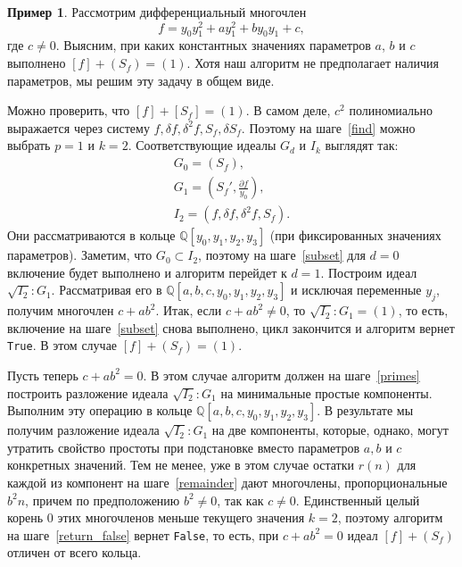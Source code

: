 \documentclass[11pt]{article}
\theoremstyle{plain}
\theoremstyle{definition}
\newtheorem{example}[theorem3]{Пример}
\theoremstyle{remark}
\begin{document}
\label{examples}
\begin{example}\label{example:first}
Рассмотрим дифференциальный многочлен 
$$
f= y_0 y_1^2+ay_1^2+by_0 y_1+c,
$$
где $c \ne 0$.
Выясним, при каких константных значениях параметров $a$, $b$ и $c$ выполнено $[f]+(S_f)=(1)$.
Хотя наш алгоритм не предполагает наличия параметров, мы решим эту задачу в общем виде.

Можно проверить, что $[f] + [S_f] = (1)$.
В самом деле, $c^2$ полиномиально выражается через систему $f, \delta f, \delta^2 f, S_f, \delta {S_f}$.
Поэтому на шаге~\ref{find} можно выбрать $p = 1$ и $k=2$.
Соответствующие идеалы $G_d$ и $I_k$ выглядят так:
\begin{gather*}
G_0 = (S_f),\\
G_1 = \left({S_f}', \frac{\partial f}{y_0} \right),\\
I_2 = \left(f, \delta f, \delta^2 f, S_f\right).
\end{gather*}
Они рассматриваются в кольце $\mathbb{Q}[y_0, y_1, y_2, y_3]$ (при фиксированных значениях параметров).
Заметим, что $G_0 \subset I_2$, поэтому на шаге~\ref{subset} для $d=0$ включение будет выполнено и алгоритм перейдет к $d=1$.
Построим идеал $\sqrt{I_2}:G_1$.
Рассматривая его в $\mathbb{Q}[a,b,c,y_0,y_1, y_2, y_3]$ и исключая переменные $y_j$, получим многочлен $c + a b^2$.
Итак, если $c + ab^2 \ne 0$, то $\sqrt{I_2}:G_1 = (1)$, то есть, включение на шаге~\ref{subset} снова выполнено,
цикл закончится и алгоритм вернет \verb'True'. В этом случае $[f] + (S_f) = (1)$.

Пусть теперь $c + a b^2 = 0$.
В этом случае алгоритм должен на шаге~\ref{primes} построить разложение идеала $\sqrt{I_2}:G_1$
на минимальные простые компоненты. 
Выполним эту операцию в кольце $\mathbb{Q}[a,b,c,y_0,y_1,y_2,y_3]$.
В результате мы получим разложение идеала $\sqrt{I_2}:G_1$ на две компоненты,
которые, однако, могут утратить свойство простоты при подстановке вместо параметров $a, b$ и $c$ конкретных значений.
Тем не менее, уже в этом случае остатки $r(n)$ для каждой из компонент на шаге~\ref{remainder} дают многочлены,
пропорциональные $b^2 n$, причем по предположению $b^2 \ne 0$, так как $c \ne 0$.
Единственный целый корень $0$ этих многочленов меньше текущего значения $k = 2$,
поэтому алгоритм на шаге~\ref{return_false} вернет \verb'False', то есть,
при $c + a b^2 = 0$ идеал $[f] + (S_f)$ отличен от всего кольца.
\end{example}
\end{document}
